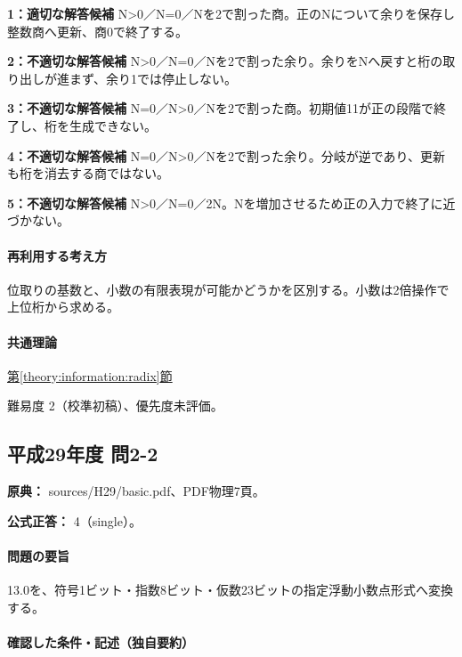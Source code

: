 \noindent\textbf{1：適切な解答候補} N>0／N=\allowbreak{}0／Nを2で割った商。正のNについて余りを保存し整数商へ更新、商0で終了する。\par

\noindent\textbf{2：不適切な解答候補} N>0／N=\allowbreak{}0／Nを2で割った余り。余りをNへ戻すと桁の取り出しが進まず、余り1では停止しない。\par

\noindent\textbf{3：不適切な解答候補} N=\allowbreak{}0／N>0／Nを2で割った商。初期値11が正の段階で終了し、桁を生成できない。\par

\noindent\textbf{4：不適切な解答候補} N=\allowbreak{}0／N>0／Nを2で割った余り。分岐が逆であり、更新も桁を消去する商ではない。\par

\noindent\textbf{5：不適切な解答候補} N>0／N=\allowbreak{}0／2N。Nを増加させるため正の入力で終了に近づかない。\par

\paragraph{再利用する考え方} 位取りの基数と、小数の有限表現が可能かどうかを区別する。小数は2倍操作で上位桁から求める。

\paragraph{共通理論} \hyperref[theory:information:radix]{第\ref*{theory:information:radix}節}

\par 難易度 2（校準初稿）、優先度未評価。

\subsection{平成29年度 問2-2}
\label{q:h29-reg-basic-2-2}

\noindent\textbf{原典：} sources/H29/basic.pdf、PDF物理7頁。

\textbf{公式正答：} 4（single）。

\paragraph{問題の要旨} 13.0を、符号1ビット・指数8ビット・仮数23ビットの指定浮動小数点形式へ変換する。

\paragraph{確認した条件・記述（独自要約）}\mbox{}\par

